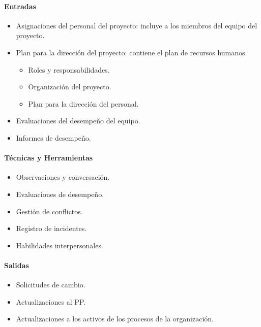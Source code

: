 \documentclass[a4paper,twosides]{article}
\newlength{\wideitemsep}
\let\olditem\item
\renewcommand{\item}{\setlength{\itemsep}{\wideitemsep}\olditem}
\begin{document}
\paragraph{Entradas}
\begin{itemize}
\item Asignaciones del personal del proyecto: incluye a los miembros del equipo del proyecto.
\item Plan para la dirección del proyecto: contiene el plan de recursos humanos.
\begin{itemize}
\item Roles y responsabilidades.
\item Organización del proyecto.
\item Plan para la dirección del personal.
\end{itemize}
\item Evaluaciones del desempeño del equipo.
\item Informes de desempeño.
\end{itemize}

\paragraph{Técnicas y Herramientas}
\begin{itemize}
\item Observaciones y conversación.
\item Evaluaciones de desempeño.
\item Gestión de conflictos.
\item Registro de incidentes.
\item Habilidades interpersonales.
\end{itemize}

\paragraph{Salidas}
\begin{itemize}
\item Solicitudes de cambio.
\item Actualizaciones al PP.
\item Actualizaciones a los activos de los procesos de la organización.
\end{itemize}
\end{document}
